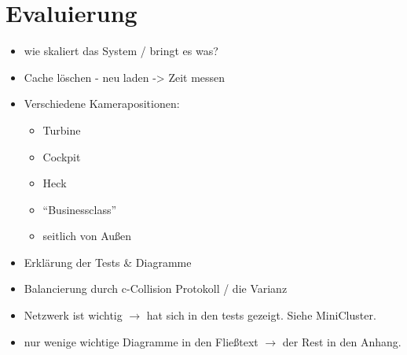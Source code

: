 \chapter{Evaluierung}
\label{chap:eval}
%
\begin{itemize}
 \item wie skaliert das System / bringt es was?
 \item Cache löschen - neu laden -> Zeit messen
 \item Verschiedene Kamerapositionen:
 \begin{itemize}
  \item Turbine
  \item Cockpit
  \item Heck
  \item ``Businessclass''
  \item seitlich von Außen
 \end{itemize}
 \item Erklärung der Tests \& Diagramme
 \item Balancierung durch c-Collision Protokoll / die Varianz
 \item Netzwerk ist wichtig $\rightarrow$ hat sich in den tests gezeigt. Siehe MiniCluster.
 \item nur wenige wichtige Diagramme in den Fließtext $\rightarrow$ der Rest in den Anhang.
\end{itemize}
%
%

%

%

%

